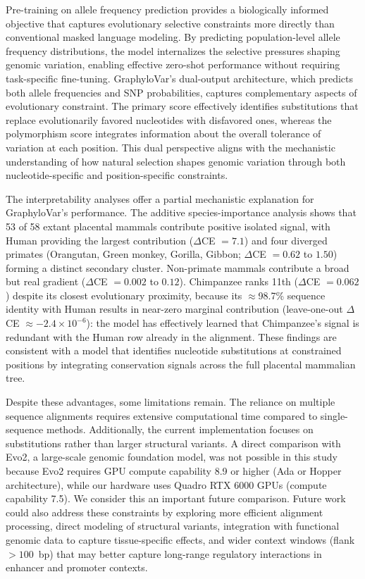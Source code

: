 \documentclass[unnumsec,webpdf,contemporary,large]{oup-authoring-template}%
\theoremstyle{thmstyleone}%
\theoremstyle{thmstyletwo}%
\theoremstyle{thmstylethree}%
\begin{document}


Pre-training on allele frequency prediction provides a biologically informed objective that captures evolutionary selective constraints more directly than conventional masked language modeling. By predicting population-level allele frequency distributions, the model internalizes the selective pressures shaping genomic variation, enabling effective zero-shot performance without requiring task-specific fine-tuning.
GraphyloVar's dual-output architecture, which predicts both allele frequencies and SNP probabilities, captures complementary aspects of evolutionary constraint. The primary score effectively identifies substitutions that replace evolutionarily favored nucleotides with disfavored ones, whereas the polymorphism score integrates information about the overall tolerance of variation at each position. This dual perspective aligns with the mechanistic understanding of how natural selection shapes genomic variation through both nucleotide-specific and position-specific constraints.

The interpretability analyses offer a partial mechanistic explanation for GraphyloVar's performance. The additive species-importance analysis shows that 53 of 58 extant placental mammals contribute positive isolated signal, with Human providing the largest contribution ($\Delta$CE $= 7.1$) and four diverged primates (Orangutan, Green monkey, Gorilla, Gibbon; $\Delta$CE $= 0.62$ to $1.50$) forming a distinct secondary cluster. Non-primate mammals contribute a broad but real gradient ($\Delta$CE $= 0.002$ to $0.12$). Chimpanzee ranks 11th ($\Delta$CE $= 0.062$) despite its closest evolutionary proximity, because its $\approx$98.7\% sequence identity with Human results in near-zero marginal contribution (leave-one-out $\Delta$CE $\approx -2.4 \times 10^{-6}$): the model has effectively learned that Chimpanzee's signal is redundant with the Human row already in the alignment. These findings are consistent with a model that identifies nucleotide substitutions at constrained positions by integrating conservation signals across the full placental mammalian tree.

Despite these advantages, some limitations remain. The reliance on multiple sequence alignments requires extensive computational time compared to single-sequence methods. Additionally, the current implementation focuses on substitutions rather than larger structural variants. A direct comparison with Evo2, a large-scale genomic foundation model, was not possible in this study because Evo2 requires GPU compute capability 8.9 or higher (Ada or Hopper architecture), while our hardware uses Quadro RTX 6000 GPUs (compute capability 7.5). We consider this an important future comparison. Future work could also address these constraints by exploring more efficient alignment processing, direct modeling of structural variants, integration with functional genomic data to capture tissue-specific effects, and wider context windows (flank $> 100$~bp) that may better capture long-range regulatory interactions in enhancer and promoter contexts.
\end{document}
